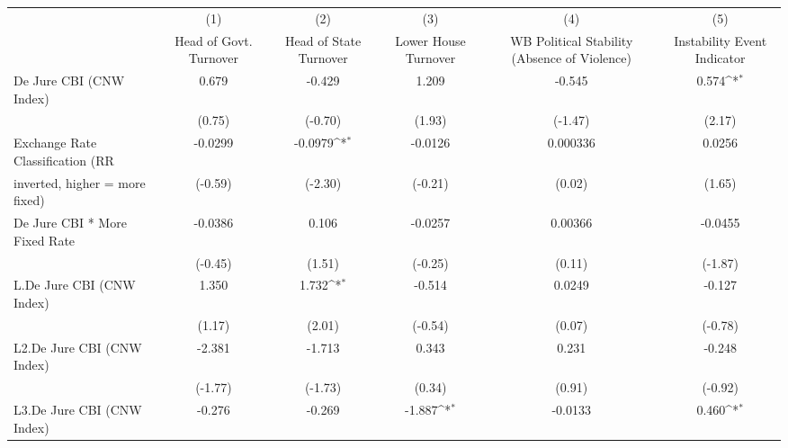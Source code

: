 {
\def\sym#1{\ifmmode^{#1}\else\(^{#1}\)\fi}
\begin{tabular}{l*{5}{c}}
\toprule
                                        &\multicolumn{1}{c}{(1)}&\multicolumn{1}{c}{(2)}&\multicolumn{1}{c}{(3)}&\multicolumn{1}{c}{(4)}&\multicolumn{1}{c}{(5)}\\
                                        &\multicolumn{1}{c}{Head of Govt. Turnover}&\multicolumn{1}{c}{Head of State Turnover}&\multicolumn{1}{c}{Lower House Turnover}&\multicolumn{1}{c}{WB Political Stability (Absence of Violence)}&\multicolumn{1}{c}{Instability Event Indicator}\\
\midrule
De Jure CBI (CNW Index)                 &    0.679         &   -0.429         &    1.209         &   -0.545         &    0.574\sym{*}  \\
                                        &   (0.75)         &  (-0.70)         &   (1.93)         &  (-1.47)         &   (2.17)         \\
\addlinespace
Exchange Rate Classification (RR        &  -0.0299         &  -0.0979\sym{*}  &  -0.0126         & 0.000336         &   0.0256         \\
inverted, higher = more fixed)          &  (-0.59)         &  (-2.30)         &  (-0.21)         &   (0.02)         &   (1.65)         \\
\addlinespace
De Jure CBI * More Fixed Rate           &  -0.0386         &    0.106         &  -0.0257         &  0.00366         &  -0.0455         \\
                                        &  (-0.45)         &   (1.51)         &  (-0.25)         &   (0.11)         &  (-1.87)         \\
\addlinespace
L.De Jure CBI (CNW Index)               &    1.350         &    1.732\sym{*}  &   -0.514         &   0.0249         &   -0.127         \\
                                        &   (1.17)         &   (2.01)         &  (-0.54)         &   (0.07)         &  (-0.78)         \\
\addlinespace
L2.De Jure CBI (CNW Index)              &   -2.381         &   -1.713         &    0.343         &    0.231         &   -0.248         \\
                                        &  (-1.77)         &  (-1.73)         &   (0.34)         &   (0.91)         &  (-0.92)         \\
\addlinespace
L3.De Jure CBI (CNW Index)              &   -0.276         &   -0.269         &   -1.887\sym{*}  &  -0.0133         &    0.460\sym{*}  \\

\end{tabular}}
